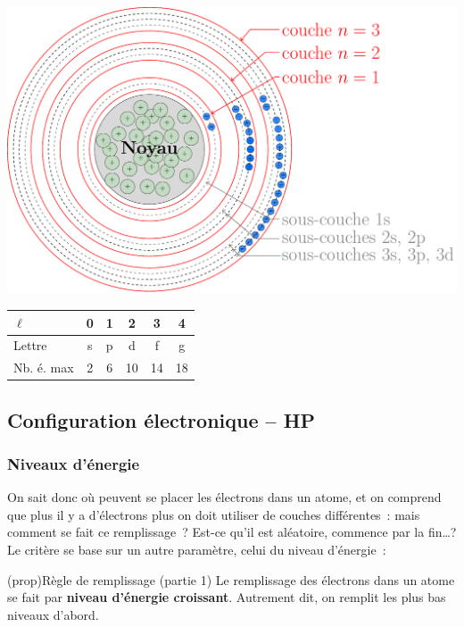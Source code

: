 \documentclass[../../main/main.tex]{subfiles}
\begin{document}
\begin{minipage}{0.53\linewidth}
	\begin{center}
		\includegraphics[width=.95\linewidth]{couchesquant}
		\label{fig:couchesquant}
	\end{center}
\end{minipage}
\hfill
\begin{minipage}{0.45\linewidth}
	\centering
	\label{tab:nbelecl}
	\begin{tabular}{lccccc}
		\toprule
		$\ell$     & 0 & 1 & 2  & 3  & 4
		\\\midrule
		Lettre     & s & p & d  & f  & g
		\\\midrule
		Nb. é. max & 2 & 6 & 10 & 14 & 18
		\\\bottomrule
	\end{tabular}
\end{minipage}

\subsection{Configuration électronique -- HP}
\subsubsection{Niveaux d'énergie}
On sait donc où peuvent se placer les électrons dans un atome, et on comprend
que plus il y a d'électrons plus on doit utiliser de couches différentes~: mais
comment se fait ce remplissage~? Est-ce qu'il est aléatoire, commence par la
fin…? Le critère se base sur un autre paramètre, celui du niveau d'énergie~:

\begin{tcb*}[cnt](prop){Règle de remplissage (partie 1)}
	Le remplissage des électrons dans un atome se fait par \textbf{niveau
		d'énergie croissant}. Autrement dit, on remplit les plus bas niveaux
	d'abord.
\end{tcb*}
\end{document}

